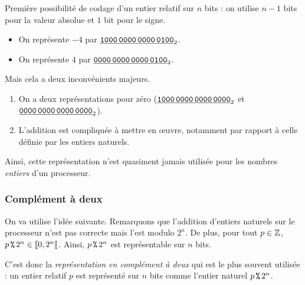 Première possibilité de codage d'un entier relatif sur $n$ bits : on utilise $n-1$ bits pour la valeur absolue et
$1$ bit pour le signe.
\begin{exemple}
\begin{itemize}
\item[\textbullet] On représente $-4$ par $\underline{\text{\texttt{1000\,0000\,0000\,0100}}}_{2}$.
\item[\textbullet] On représente $4$ par $\underline{\text{\texttt{0000\,0000\,0000\,0100}}}_{2}$.
\end{itemize}  
\end{exemple}

Mais cela a deux inconvénients majeurs.
\begin{enumerate}
\item On a deux représentations pour zéro ($\underline{\text{\texttt{1000\,0000\,0000\,0000}}}_{2}$
  et $\underline{\text{\texttt{0000\,0000\,0000\,0000}}}_{2}$).
\item L'addition est compliquée à mettre en {\oe}uvre, notamment par rapport à celle définie par les entiers naturels.
\end{enumerate}

Ainsi, cette représentation n'est quasiment jamais utilisée pour les nombres
\emph{entiers} d'un processeur.
\subsubsection{Complément à deux}

On va utilise l'idée suivante. Remarquons que l'addition d'entiers naturels sur le processeur n'est pas
  correcte mais l'est modulo $2^{n}$. De plus, pour tout $p\in \mathbb{Z}$, $p\operatorname{\texttt{\%}} 2^{n} \in [\![0,2^{n}[\![$. 
  Ainsi, $p\operatorname{\texttt{\%}} 2^{n}$ est représentable sur $n$ bits.
  
C'est donc la \emph{représentation en complément à deux} qui est le plus souvent utilisée : un entier relatif $p$ est représenté sur $n$ bits comme l'entier naturel $p\operatorname{\texttt{\%}} 2^n$. 

